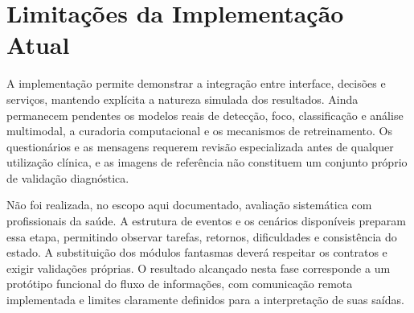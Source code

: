 \section{Limitações da Implementação Atual}
A implementação permite demonstrar a integração entre interface, decisões e serviços, mantendo explícita a natureza simulada dos resultados. Ainda permanecem pendentes os modelos reais de detecção, foco, classificação e análise multimodal, a curadoria computacional e os mecanismos de retreinamento. Os questionários e as mensagens requerem revisão especializada antes de qualquer utilização clínica, e as imagens de referência não constituem um conjunto próprio de validação diagnóstica.

Não foi realizada, no escopo aqui documentado, avaliação sistemática com profissionais da saúde. A estrutura de eventos e os cenários disponíveis preparam essa etapa, permitindo observar tarefas, retornos, dificuldades e consistência do estado. A substituição dos módulos fantasmas deverá respeitar os contratos e exigir validações próprias. O resultado alcançado nesta fase corresponde a um protótipo funcional do fluxo de informações, com comunicação remota implementada e limites claramente definidos para a interpretação de suas saídas.

\clearpage
